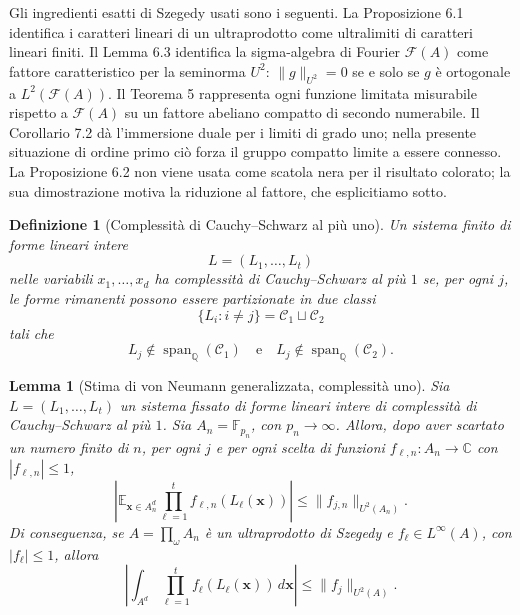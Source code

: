 \documentclass[11pt]{article}
\numberwithin{equation}{section}
\newtheorem{lemma}[theorem]{Lemma}
\newtheorem{definition}[theorem]{Definizione}
\newcommand{\E}{\mathbb E}
\newcommand{\F}{\mathbb F}
\newcommand{\C}{\mathbb C}
\newcommand{\1}{\mathbf 1}
\newcommand{\Span}{\operatorname{span}}
\newcommand{\calF}{\mathcal F}
\begin{document}
Gli ingredienti esatti di Szegedy usati sono i seguenti. La Proposizione 6.1 identifica i caratteri lineari di un ultraprodotto come ultralimiti di caratteri lineari finiti. Il Lemma 6.3 identifica la sigma-algebra di Fourier \(\calF(A)\) come fattore caratteristico per la seminorma \(U^2\): \(\|g\|_{U^2}=0\) se e solo se \(g\) è ortogonale a \(L^2(\calF(A))\). Il Teorema 5 rappresenta ogni funzione limitata misurabile rispetto a \(\calF(A)\) su un fattore abeliano compatto di secondo numerabile. Il Corollario 7.2 dà l'immersione duale per i limiti di grado uno; nella presente situazione di ordine primo ciò forza il gruppo compatto limite a essere connesso. La Proposizione 6.2 non viene usata come scatola nera per il risultato colorato; la sua dimostrazione motiva la riduzione al fattore, che esplicitiamo sotto.

\begin{definition}[Complessità di Cauchy--Schwarz al più uno]
Un sistema finito di forme lineari intere
\[
        L=(L_1,\ldots,L_t)
\]
nelle variabili \(x_1,\ldots,x_d\) ha complessità di Cauchy--Schwarz al più \(1\) se, per ogni \(j\), le forme rimanenti possono essere partizionate in due classi
\[
        \{L_i:i\ne j\}=\mathcal C_1\sqcup\mathcal C_2
\]
tali che
\[
        L_j\notin\Span_{\mathbb Q}(\mathcal C_1)
        \quad\text{e}\quad
        L_j\notin\Span_{\mathbb Q}(\mathcal C_2).
\]
\end{definition}

\begin{lemma}[Stima di von Neumann generalizzata, complessità uno]
\label{lem:gvn}
Sia \(L=(L_1,\ldots,L_t)\) un sistema fissato di forme lineari intere di complessità di Cauchy--Schwarz al più \(1\). Sia \(A_n=\F_{p_n}\), con \(p_n\to\infty\). Allora, dopo aver scartato un numero finito di \(n\), per ogni \(j\) e per ogni scelta di funzioni \(f_{\ell,n}:A_n\to\C\) con \(|f_{\ell,n}|\le1\),
\[
\left|
\E_{\mathbf x\in A_n^d}
\prod_{\ell=1}^t f_{\ell,n}(L_\ell(\mathbf x))
\right|
\le
\|f_{j,n}\|_{U^2(A_n)}.
\]
Di conseguenza, se \(A=\prod_\omega A_n\) è un ultraprodotto di Szegedy e \(f_\ell\in L^\infty(A)\), con \(|f_\ell|\le1\), allora
\[
\left|
\int_{A^d}
\prod_{\ell=1}^t f_\ell(L_\ell(\mathbf x))\,d\mathbf x
\right|
\le
\|f_j\|_{U^2(A)}.
\]
\end{lemma}
\end{document}
